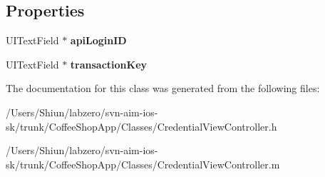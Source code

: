 \subsection*{Properties}
\begin{DoxyCompactItemize}
\item 
\hypertarget{interface_credential_view_controller_a6e69943520e5db808ecb95f2bf834bdd}{
UITextField $\ast$ {\bfseries apiLoginID}}
\label{interface_credential_view_controller_a6e69943520e5db808ecb95f2bf834bdd}

\item 
\hypertarget{interface_credential_view_controller_a4b7365bb004dffefec18144409e73fb5}{
UITextField $\ast$ {\bfseries transactionKey}}
\label{interface_credential_view_controller_a4b7365bb004dffefec18144409e73fb5}

\end{DoxyCompactItemize}


The documentation for this class was generated from the following files:\begin{DoxyCompactItemize}
\item 
/Users/Shiun/labzero/svn-\/aim-\/ios-\/sk/trunk/CoffeeShopApp/Classes/CredentialViewController.h\item 
/Users/Shiun/labzero/svn-\/aim-\/ios-\/sk/trunk/CoffeeShopApp/Classes/CredentialViewController.m\end{DoxyCompactItemize}

